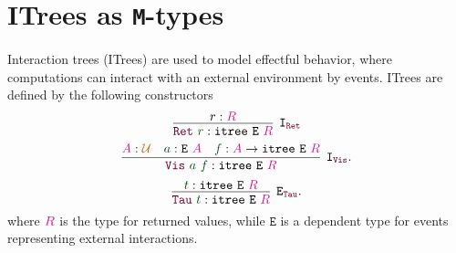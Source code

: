 \documentclass[twoside,11pt,openright]{report}
\theoremstyle{plain} %
\theoremstyle{definition}
\theoremstyle{remark}
\newcommand*{\term}[1]{\textcolor{green!30!black}{#1}} %
\newcommand*{\type}[1]{\textcolor{magenta!90!black}{#1}}
\newcommand*{\universe}[1]{\textcolor{orange!80!black}{#1}}
\newcommand*{\constructor}[1]{\textcolor{purple!60!black}{\ensuremath{\mathtt{#1}}}}
\newcommand*{\typeformer}[1]{\ensuremath{\mathtt{#1}}}
\begin{document}
\section{ITrees as \texttt{M}-types}
Interaction trees (ITrees) \cite{DBLP:itrees} are used to model effectful behavior, where computations can interact with an external environment by events. ITrees are defined by the following constructors
\begin{equation}
  \vcenter{\infer[\mathtt{I}_{\constructor{Ret}}]{\constructor{Ret}~\term{r} : \typeformer{itree}~\typeformer{E}~\type{R}}{r : \type{R}}}
\end{equation}
\begin{equation}
  \vcenter{\infer[\mathtt{I}_{\constructor{Vis}}]{\constructor{Vis}~\term{a}~\term{f} : \typeformer{itree}~\typeformer{E}~\type{R}}{\type{A} : \universe{\mathcal{U}} & \term{a} : \typeformer{E}~\type{A} & \term{f} : \type{A} \rightarrow \typeformer{itree}~\typeformer{E}~\type{R}}}.
\end{equation}
\begin{equation}
  \vcenter{\infer[\mathtt{E}_{\constructor{Tau}}]{\constructor{Tau}~\term{t} : \typeformer{itree}~\typeformer{E}~\type{R}}{\term{t} : \typeformer{itree}~\typeformer{E}~\type{R}}}.
\end{equation}
where \(\type{R}\) is the type for returned values, while \(\typeformer{E}\) is a dependent type for events representing external interactions.
\end{document}
